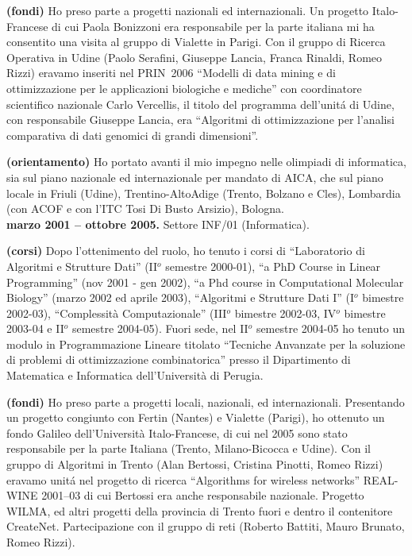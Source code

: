 {\bf (fondi)} Ho preso parte a progetti nazionali ed internazionali.
Un progetto Italo-Francese di cui Paola Bonizzoni era responsabile per la parte italiana
mi ha consentito una visita al gruppo di Vialette in Parigi.
Con il gruppo di Ricerca Operativa in Udine (Paolo Serafini, Giuseppe Lancia, Franca Rinaldi, Romeo Rizzi) eravamo inseriti nel PRIN~2006 ``Modelli di data mining e di ottimizzazione per le applicazioni biologiche e mediche'' con coordinatore scientifico nazionale Carlo Vercellis, il titolo del programma dell'unit\'a di Udine, con responsabile Giuseppe Lancia,
era ``Algoritmi di ottimizzazione per l'analisi comparativa di dati genomici di grandi dimensioni''.

{\bf (orientamento)} Ho portato avanti il mio impegno nelle olimpiadi di informatica,
sia sul piano nazionale ed internazionale per mandato di AICA,
che sul piano locale in Friuli (Udine), Trentino-AltoAdige (Trento, Bolzano e Cles), Lombardia (con ACOF e con l'ITC Tosi Di Busto Arsizio), Bologna.\\



{\bf marzo 2001 -- ottobre 2005.}
Settore INF/01 (Informatica).

{\bf (corsi)} Dopo l'ottenimento del ruolo,
ho tenuto i corsi di ``Laboratorio di Algoritmi e Strutture Dati''
(II$^o$ semestre 2000-01),
``a PhD Course in Linear Programming'' (nov 2001 - gen 2002),
``a Phd course in Computational Molecular Biology'' (marzo 2002 ed aprile 2003),
``Algoritmi e Strutture Dati I'' (I$^o$ bimestre 2002-03),
``Complessit\`a Computazionale'' (III$^o$ bimestre 2002-03,
IV$^o$ bimestre 2003-04 e II$^o$ semestre 2004-05).
Fuori sede, nel II$^o$ semestre 2004-05
ho tenuto un modulo in Programmazione Lineare
titolato ``Tecniche Anvanzate per la soluzione di problemi di ottimizzazione
combinatorica''
presso il Dipartimento di Matematica e Informatica
dell'Universit\`a di Perugia.

{\bf (fondi)} Ho preso parte a progetti locali, nazionali, ed internazionali.
Presentando un progetto congiunto con Fertin (Nantes) e Vialette (Parigi),
ho ottenuto un fondo Galileo dell'Universit\`a Italo-Francese,
di cui nel 2005 sono stato responsabile
per la parte Italiana (Trento, Milano-Bicocca e Udine).
Con il gruppo di Algoritmi in Trento (Alan Bertossi, Cristina Pinotti, Romeo Rizzi)
eravamo unit\'a nel progetto di ricerca ``Algorithms for wireless networks''
REAL-WINE 2001--03 di cui Bertossi era anche responsabile nazionale.
Progetto WILMA, ed altri progetti della provincia di Trento fuori e dentro il contenitore CreateNet. Partecipazione con il gruppo di reti (Roberto Battiti, Mauro Brunato, Romeo Rizzi).

